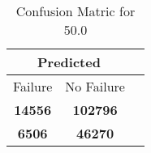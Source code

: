 \begin{table}[] 
\caption{Confusion Matric for 50.0} 
\label{Table: Prediction Accuracy-DMD50.0OnlySunEKF-combinationReflectionEKF-top2-Reflection} 
\centering 
\begin{tabular} 
 {@{}ccc@{}} 
\toprule 
\multicolumn{2}{c}{\textbf{Predicted}}
 \\ \midrule 
\multicolumn{1}{|c|}{Failure} & 
\multicolumn{1}{c|}{No Failure}
 \\ \midrule 
\multicolumn{1}{|c|}{\color{green}\textbf{14556}} & 
\multicolumn{1}{c|}{\color{green}\textbf{102796}}
 \\ \midrule 
\multicolumn{1}{|c|}{\color{red}\textbf{6506}} & 
\multicolumn{1}{c|}{\color{red}\textbf{46270}}
 \\ \bottomrule 
\end{tabular} 
\end{table} 
